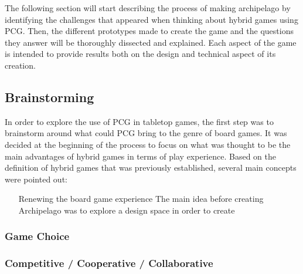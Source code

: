 The following section will start describing the process of making archipelago by identifying the challenges that appeared when thinking about hybrid games using PCG. Then, the different prototypes made to create the game and the questions they answer will be thoroughly dissected and explained. Each aspect of the game is intended to provide results both on the design and technical aspect of its creation. 
\subsection{Brainstorming}

In order to explore the use of PCG in tabletop games, the first step was to brainstorm around what could PCG bring to the genre of board games. It was decided at the beginning of the process to focus on what was thought to be the main advantages of hybrid games in terms of play experience. Based on the definition of hybrid games that was previously established, several main concepts were pointed out:
\begin{itemize}
\item[Renewing the board game experience]
The main idea before creating Archipelago was to explore a design space in order to create 
\end{itemize}
\subsubsection{Game Choice}
\subsubsection{Competitive / Cooperative / Collaborative}
